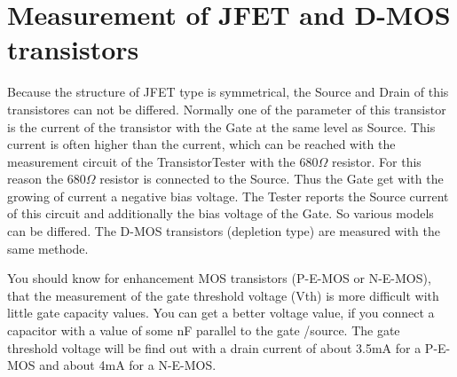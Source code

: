 \section{Measurement of JFET and D-MOS transistors}
Because the structure of JFET type is symmetrical, the Source and Drain of this transistores can not
be differed.
Normally one of the parameter of this transistor is the current of the transistor with the Gate at the same level as Source.
This current is often higher than the current, which can be reached with the measurement circuit of the TransistorTester
with the \(680 \Omega\) resistor.
For this reason the \(680 \Omega\) resistor is connected to the Source. Thus the Gate get with the growing of current a negative
bias voltage.
The Tester reports the Source current of this circuit and additionally the bias voltage of the Gate.
So various models can be differed.
The D-MOS transistors (depletion type) are measured with the same methode.

You should know for enhancement MOS transistors (P-E-MOS or N-E-MOS), that the measurement of the gate threshold voltage (Vth)
is more difficult with little gate capacity values. You can get a better voltage value, if you connect a capacitor with a value
of some nF parallel to the gate /source.
The gate threshold voltage will be find out with a drain current of about 3.5mA for a P-E-MOS and about 4mA for a N-E-MOS.

